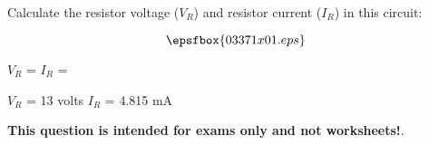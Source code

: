 

Calculate the resistor voltage ($V_R$) and resistor current ($I_R$) in this circuit:

$$\epsfbox{03371x01.eps}$$

$V_R$ = \hskip 150pt $I_R$ = 







$V_R$ = 13 volts \hskip 100pt $I_R$ = 4.815 mA







{\bf This question is intended for exams only and not worksheets!}.



